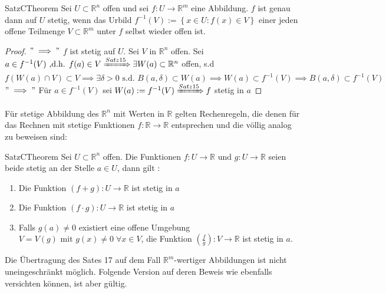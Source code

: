\documentclass[a4paper]{memoir}
\begin{document}
\begin{ibox}[16]{Satz}{CTheorem}
    Sei $ U \subset  \mathbb{R}^n  $ offen und sei $ f: U \to \mathbb{R}^m $ eine Abbildung. $ f $ ist genau dann auf $ U  $ stetig,
	wenn das Urbild $ f^{-1}(V) := \left\{ x \in U : f(x) \in V \right\}  $ einer jeden offene Teilmenge $ V \subset  \mathbb{R}^m $ unter
	$ f $ selbst wieder offen ist.
\end{ibox}

\begin{proof}
	$ " \implies" $ $ f $ ist stetig auf $ U $. Sei $ V  $ in $ \mathbb{R}^n  $ offen. Sei $ a \in  f^{-1}(V) \text{ ,d.h. } f(a) 
	\in  V  \xRightarrow{Satz 15} \exists W(a) \subset  \mathbb{R}^n $ offen, s.d $ f(W(a) \cap V) \subset  V \implies  \exists \delta
> 0 \text{ s.d. } B(a, \delta) \subset  W(a) \implies  W(a) \subset  f^{-1}(V) \implies  B(a, \delta) \subset  f^{-1}(V)$ \\
$ " \implies " $ Für $ a \in f^{-1}(V) $ sei $ W(a) := f^{-1}(V) \xRightarrow{Satz 15} f $ stetig in $ a $  
\end{proof}


Für stetige Abbildung des $ \mathbb{R}^n  $ mit Werten in $ \mathbb{R}  $ 
gelten Rechenregeln, die denen für das Rechnen mit stetige Funktionen $ f: \mathbb{R}  \to \mathbb{R}  $ entsprechen und die völlig
analog zu beweisen sind:

\begin{ibox}[17]{Satz}{CTheorem}
    Sei $ U \subset \mathbb{R}^n  $ offen. Die Funktionen $ f : U \to \mathbb{R} \text{ und } g : U \to \mathbb{R}  $ seien beide 
	stetig an der Stelle $ a \in  U $, dann gilt :
	\begin{enumerate}[label=\alph*)]
		\item Die Funktion $ (f+g):U \to \mathbb{R}  $ ist stetig in $ a $ 
		\item Die Funktion $ (f \cdot g) : U \to \mathbb{R}  $ ist stetig in $ a $ 
		\item Falls $ g(a) \neq 0 $ existiert eine offene Umgebung $ V = V(g) \text{ mit } g(x) \neq 0 \; \forall x \in  V $,
			die Funktion $ \left( \frac{f}{g}\right) : V \to \mathbb{R}    $ ist stetig in $ a $.  
	\end{enumerate}
	
\end{ibox}

Die Übertragung des Sates 17 auf dem Fall $ \mathbb{R}^m  $-wertiger Abbildungen ist nicht uneingeschränkt möglich. Folgende Version auf 
deren Beweis wie ebenfalls versichten können, ist aber gültig. 
\end{document}
